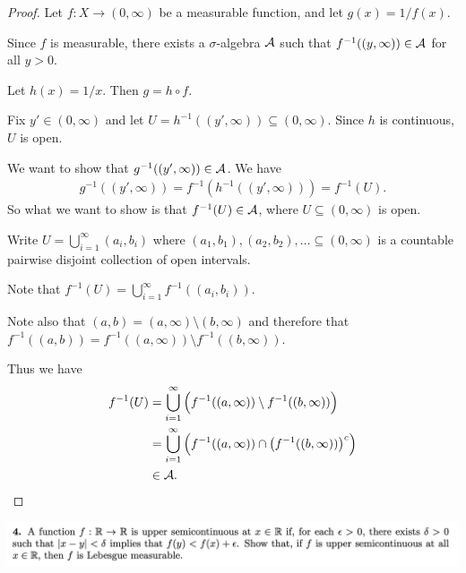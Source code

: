 \begin{proof}
  Let $f: X \to (0, \infty)$ be a measurable function, and let $g(x) = 1/f(x)$.

  Since $f$ is measurable, there exists a $\sigma$-algebra $\mathcal A$ such that $f^{-1}((y, \infty)) \in \mathcal A$
  for all $y > 0$.

  Let $h(x) = 1/x$. Then $g = h \circ f$.

  Fix $y' \in (0, \infty)$ and let $U = h^{-1}((y', \infty)) \subseteq (0, \infty)$. Since $h$ is
  continuous, $U$ is open.

  We want to show that $g^{-1}((y', \infty)) \in \mathcal A$. We have
  \begin{align*}
    g^{-1}((y', \infty)) = f^{-1}(h^{-1}((y', \infty))) = f^{-1}(U).
  \end{align*}
  So what we want to show is that $f^{-1}(U) \in \mathcal A$, where $U \subseteq (0, \infty)$ is open.

  Write $U = \bigcup_{i=1}^\infty (a_i, b_i)$ where $(a_1, b_1), (a_2, b_2), \ldots \subseteq (0, \infty)$ is a
  countable pairwise disjoint collection of open intervals.

  Note that $f^{-1}(U) = \bigcup_{i=1}^\infty f^{-1}((a_i, b_i))$.

  Note also that $(a, b) = (a, \infty) \setminus (b, \infty)$ and therefore
  that $f^{-1}((a, b)) = f^{-1}((a, \infty)) \setminus f^{-1}((b, \infty))$.

  Thus we have
  \begin{align*}
    f^{-1}(U)
    &= \bigcup_{i=1}^\infty \Big(f^{-1}((a, \infty)) \setminus f^{-1}((b, \infty))\Big) \\
    &= \bigcup_{i=1}^\infty \Big(f^{-1}((a, \infty)) \cap \big(f^{-1}((b, \infty))\big)^c\Big) \\
    &\in \mathcal A.
  \end{align*}
\end{proof}


\newpage
\begin{mdframed}
\includegraphics[width=400pt]{img/analysis--berkeley-202a-hw06-90b1.png}
\end{mdframed}




